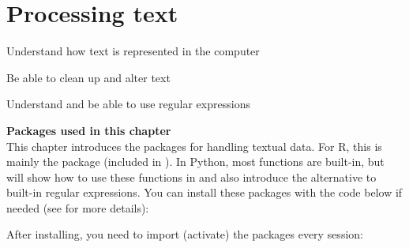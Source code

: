 \chapter{Processing text}
\label{chap:protext}


\begin{abstract}{Abstract}
Many data sets that are relevant for social science consist of textual data, from political discussions and newspaper archives to open-ended survey questions and reviews. This chapter gives an introduction in dealing with textual data using base functions in Python and (mostly) the  package in R. 
\end{abstract}


\begin{objectives}
\item Understand how text is represented in the computer
\item Be able to clean up and alter text
\item Understand and be able to use regular expressions 
\end{objectives}


\newpage
\begin{feature}
  \textbf{Packages used in this chapter}\\
  This chapter introduces the packages for handling textual data.
  For R, this is mainly the  package (included in \tidyverse).
  In Python, most functions are built-in, but will show how to use these functions in  and also introduce the  alternative to built-in regular expressions.
You can install these packages with the code below if needed  (see  for more details):


\noindent After installing, you need to import (activate) the packages every session:


\end{feature}







